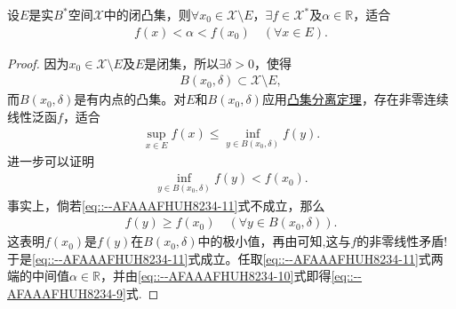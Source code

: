 \documentclass[../../main.tex]{subfiles}%
\begin{document}
\begin{corollary}[Ascoli定理]\label{corollary:泛函分析--Ascoli定理}
设$E$是实$B^*$空间$\mathscr{X}$中的闭凸集，则$\forall x_0 \in \mathscr{X} \setminus E$，$\exists f \in \mathscr{X}^*$及$\alpha \in \mathbb{R}$，适合
\begin{align}
f(x) < \alpha < f(x_0) \quad (\forall x \in E).
\label{eq::--AFAAAFHUH8234-9}
\end{align}
\end{corollary}
\begin{proof}

因为$x_0 \in \mathscr{X} \setminus E$及$E$是闭集，所以$\exists \delta > 0$，使得
\begin{align*}
B(x_0, \delta) \subset \mathscr{X} \setminus E,
\end{align*}
而$B(x_0, \delta)$是有内点的凸集。对$E$和$B(x_0, \delta)$应用\hyperref[theorem:泛函分析--凸集分离定理]{凸集分离定理}，存在非零连续线性泛函$f$，适合
\begin{align}
\sup\limits_{x \in E} f(x) \leqslant \inf\limits_{y \in B(x_0, \delta)} f(y).
\label{eq::--AFAAAFHUH8234-10}
\end{align}
进一步可以证明
\begin{align}
\inf\limits_{y \in B(x_0, \delta)} f(y) < f(x_0).
\label{eq::--AFAAAFHUH8234-11}
\end{align}
事实上，倘若\eqref{eq::--AFAAAFHUH8234-11}式不成立，那么
\begin{align*}
f(y) \geqslant f(x_0) \quad (\forall y \in B(x_0, \delta)).
\end{align*}
这表明$f(x_0)$是$f(y)$在$B(x_0, \delta)$中的极小值，再由可知,这与$f$的非零线性矛盾!于是\eqref{eq::--AFAAAFHUH8234-11}式成立。任取\eqref{eq::--AFAAAFHUH8234-11}式两端的中间值$\alpha \in \mathbb{R}$，并由\eqref{eq::--AFAAAFHUH8234-10}式即得\eqref{eq::--AFAAAFHUH8234-9}式.

\end{proof}
\end{document}
